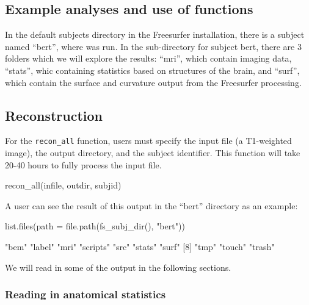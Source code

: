 \subsection{Example analyses and use of
functions}\label{example-analyses-and-use-of-functions}

In the default subjects directory in the Freesurfer installation, there
is a subject named ``bert'', where  was run. In the
sub-directory for subject bert, there are 3 folders which we will
explore the results: ``mri'', which contain imaging data, ``stats'',
whic containing statistics based on structures of the brain, and
``surf'', which contain the surface and curvature output from the
Freesurfer processing.

\subsection{Reconstruction}\label{reconstruction}

For the \texttt{recon\_all} function, users must specify the input file
(a T1-weighted image), the output directory, and the subject identifier.
This function will take 20-40 hours to fully process the input file.

\begin{Schunk}
\begin{Sinput}
recon_all(infile, outdir, subjid)
\end{Sinput}
\end{Schunk}

A user can see the result of this output in the ``bert'' directory as an
example:

\begin{Schunk}
\begin{Sinput}
list.files(path  = file.path(fs_subj_dir(), "bert"))
\end{Sinput}
\begin{Soutput}
 [1] "bem"     "label"   "mri"     "scripts" "src"     "stats"   "surf"   
 [8] "tmp"     "touch"   "trash"  
\end{Soutput}
\end{Schunk}

We will read in some of the output in the following sections.

\subsubsection{Reading in anatomical
statistics}\label{reading-in-anatomical-statistics}

